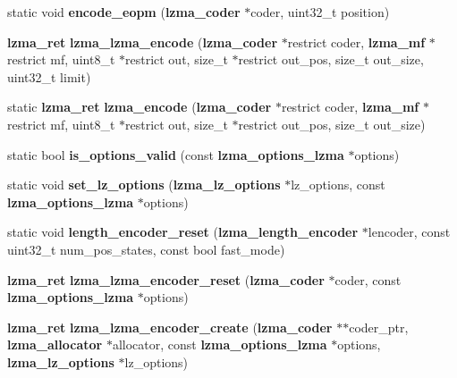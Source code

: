 \begin{DoxyCompactItemize}
\item 
static void {\bfseries encode\-\_\-eopm} ({\bf lzma\-\_\-coder} $\ast$coder, uint32\-\_\-t position)\label{lzma__encoder_8c_a1faf6e3c3c9f322e5e35981b03bfefda}

\item 
{\bf lzma\-\_\-ret} {\bfseries lzma\-\_\-lzma\-\_\-encode} ({\bf lzma\-\_\-coder} $\ast$restrict coder, {\bf lzma\-\_\-mf} $\ast$restrict mf, uint8\-\_\-t $\ast$restrict out, size\-\_\-t $\ast$restrict out\-\_\-pos, size\-\_\-t out\-\_\-size, uint32\-\_\-t limit)\label{lzma__encoder_8c_a16770d92face441bd618da718f406aff}

\item 
static {\bf lzma\-\_\-ret} {\bfseries lzma\-\_\-encode} ({\bf lzma\-\_\-coder} $\ast$restrict coder, {\bf lzma\-\_\-mf} $\ast$restrict mf, uint8\-\_\-t $\ast$restrict out, size\-\_\-t $\ast$restrict out\-\_\-pos, size\-\_\-t out\-\_\-size)\label{lzma__encoder_8c_ac22de190d666e52c21a0f813e51d23dd}

\item 
static bool {\bfseries is\-\_\-options\-\_\-valid} (const {\bf lzma\-\_\-options\-\_\-lzma} $\ast$options)\label{lzma__encoder_8c_a1426dd8519ffbb53ea746985452a9228}

\item 
static void {\bfseries set\-\_\-lz\-\_\-options} ({\bf lzma\-\_\-lz\-\_\-options} $\ast$lz\-\_\-options, const {\bf lzma\-\_\-options\-\_\-lzma} $\ast$options)\label{lzma__encoder_8c_a320e15eb89bf06c7d0bc3475ad7f799f}

\item 
static void {\bfseries length\-\_\-encoder\-\_\-reset} ({\bf lzma\-\_\-length\-\_\-encoder} $\ast$lencoder, const uint32\-\_\-t num\-\_\-pos\-\_\-states, const bool fast\-\_\-mode)\label{lzma__encoder_8c_a5cf00161eefbc2d476682c93a50909b5}

\item 
{\bf lzma\-\_\-ret} {\bfseries lzma\-\_\-lzma\-\_\-encoder\-\_\-reset} ({\bf lzma\-\_\-coder} $\ast$coder, const {\bf lzma\-\_\-options\-\_\-lzma} $\ast$options)\label{lzma__encoder_8c_ad81c4d4e221c46e1bf7a28f88d573ee4}

\item 
{\bf lzma\-\_\-ret} {\bfseries lzma\-\_\-lzma\-\_\-encoder\-\_\-create} ({\bf lzma\-\_\-coder} $\ast$$\ast$coder\-\_\-ptr, {\bf lzma\-\_\-allocator} $\ast$allocator, const {\bf lzma\-\_\-options\-\_\-lzma} $\ast$options, {\bf lzma\-\_\-lz\-\_\-options} $\ast$lz\-\_\-options)\label{lzma__encoder_8c_aa391fa00c7e34976fdcfa58643a8316b}


\end{DoxyCompactItemize}
